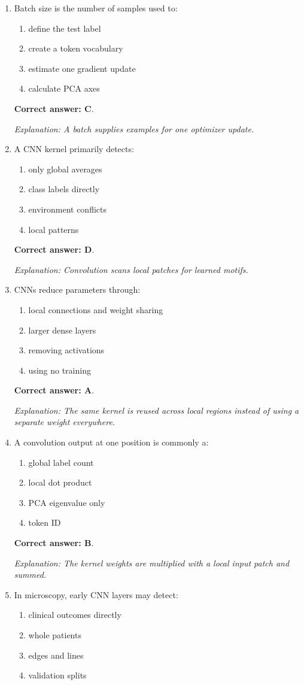 \documentclass[10pt,a4paper]{article}
\newcommand{\ans}[1]{\par\textbf{Correct answer: #1}}
\newcommand{\expn}[1]{\par\textit{Explanation: #1}}
\begin{document}
\begin{enumerate}[label=\textbf{\arabic*.},itemsep=4pt]
\ans{B}. \expn{The model is fitting training examples without improving unseen-data performance.}
\item Batch size is the number of samples used to:
\begin{enumerate}[label=\Alph*.,itemsep=0pt]\item define the test label\item create a token vocabulary\item estimate one gradient update\item calculate PCA axes\end{enumerate}
\ans{C}. \expn{A batch supplies examples for one optimizer update.}
\item A CNN kernel primarily detects:
\begin{enumerate}[label=\Alph*.,itemsep=0pt]\item only global averages\item class labels directly\item environment conflicts\item local patterns\end{enumerate}
\ans{D}. \expn{Convolution scans local patches for learned motifs.}
\item CNNs reduce parameters through:
\begin{enumerate}[label=\Alph*.,itemsep=0pt]\item local connections and weight sharing\item larger dense layers\item removing activations\item using no training\end{enumerate}
\ans{A}. \expn{The same kernel is reused across local regions instead of using a separate weight everywhere.}
\item A convolution output at one position is commonly a:
\begin{enumerate}[label=\Alph*.,itemsep=0pt]\item global label count\item local dot product\item PCA eigenvalue only\item token ID\end{enumerate}
\ans{B}. \expn{The kernel weights are multiplied with a local input patch and summed.}
\item In microscopy, early CNN layers may detect:
\begin{enumerate}[label=\Alph*.,itemsep=0pt]\item clinical outcomes directly\item whole patients\item edges and lines\item validation splits\end{enumerate}

\end{enumerate}
\end{document}
